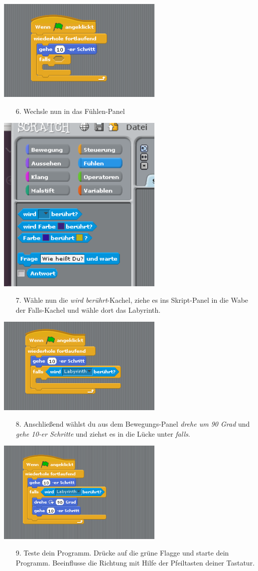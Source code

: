 \includegraphics[width=0.6\textwidth]{images/aufgabe2_automat3.png}
\begin{itemize}
\item[6.] Wechsle nun in das Fühlen-Panel
\end{itemize}
\includegraphics[width=0.6\textwidth]{images/aufgabe2_fuehlen.png}
\begin{itemize}
\item[7.] Wähle nun die \textit{wird berührt}-Kachel, ziehe es ins Skript-Panel in die Wabe der Falls-Kachel und wähle dort das Labyrinth. 
\end{itemize}
\includegraphics[width=0.6\textwidth]{images/aufgabe2_automat4.png}
\begin{itemize}
\item[8.] Anschließend wählst du aus dem Bewegungs-Panel \textit{drehe um 90 Grad} und \textit{gehe 10-er Schritte} und ziehst es in die Lücke unter \textit{falls}.
\end{itemize}
\includegraphics[width=0.6\textwidth]{images/aufgabe2_automat5.png}
\begin{itemize}
\item[9.] Teste dein Programm. Drücke auf die grüne Flagge und starte dein Programm. Beeinflusse die Richtung mit Hilfe der Pfeiltasten deiner Tastatur.
\end{itemize}
